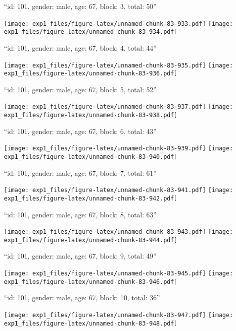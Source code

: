 \documentclass[11pt,,]{article}
\begin{document}
\newpage
[1] 

``id: 101, gender: male, age: 67, block: 3, total: 50''

\texttt{[image: exp1\_files/figure-latex/unnamed-chunk-83-933.pdf]}
\texttt{[image: exp1\_files/figure-latex/unnamed-chunk-83-934.pdf]}

\newpage
[1] 

``id: 101, gender: male, age: 67, block: 4, total: 44''

\texttt{[image: exp1\_files/figure-latex/unnamed-chunk-83-935.pdf]}
\texttt{[image: exp1\_files/figure-latex/unnamed-chunk-83-936.pdf]}

\newpage
[1] 

``id: 101, gender: male, age: 67, block: 5, total: 52''

\texttt{[image: exp1\_files/figure-latex/unnamed-chunk-83-937.pdf]}
\texttt{[image: exp1\_files/figure-latex/unnamed-chunk-83-938.pdf]}

\newpage
[1] 

``id: 101, gender: male, age: 67, block: 6, total: 43''

\texttt{[image: exp1\_files/figure-latex/unnamed-chunk-83-939.pdf]}
\texttt{[image: exp1\_files/figure-latex/unnamed-chunk-83-940.pdf]}

\newpage
[1] 

``id: 101, gender: male, age: 67, block: 7, total: 61''

\texttt{[image: exp1\_files/figure-latex/unnamed-chunk-83-941.pdf]}
\texttt{[image: exp1\_files/figure-latex/unnamed-chunk-83-942.pdf]}

\newpage
[1] 

``id: 101, gender: male, age: 67, block: 8, total: 63''

\texttt{[image: exp1\_files/figure-latex/unnamed-chunk-83-943.pdf]}
\texttt{[image: exp1\_files/figure-latex/unnamed-chunk-83-944.pdf]}

\newpage
[1] 

``id: 101, gender: male, age: 67, block: 9, total: 49''

\texttt{[image: exp1\_files/figure-latex/unnamed-chunk-83-945.pdf]}
\texttt{[image: exp1\_files/figure-latex/unnamed-chunk-83-946.pdf]}

\newpage
[1] 

``id: 101, gender: male, age: 67, block: 10, total: 36''

\texttt{[image: exp1\_files/figure-latex/unnamed-chunk-83-947.pdf]}
\texttt{[image: exp1\_files/figure-latex/unnamed-chunk-83-948.pdf]}
\end{document}
